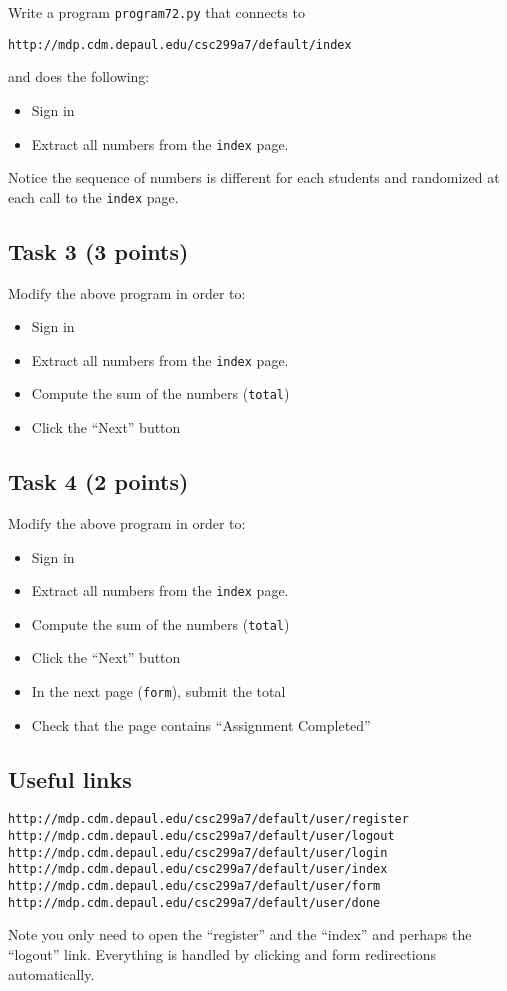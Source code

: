 \documentclass[12pt]{article}
\begin{document}
\noindent Write a program {\tt program72.py} that connects to 

\begin{verbatim}
http://mdp.cdm.depaul.edu/csc299a7/default/index
\end{verbatim}

and does the following:
\begin{itemize}
\item Sign in
\item Extract all numbers from the {\tt index} page.
\end{itemize}

Notice the sequence of numbers is different for each students and randomized at each call to the {\tt index} page.

\subsection{Task 3 (3 points)}

\noindent Modify the above program in order to:
\begin{itemize}
\item Sign in
\item Extract all numbers from the {\tt index} page.
\item Compute the sum of the numbers ({\tt total})
\item Click the ``Next'' button
\end{itemize}

\subsection{Task 4 (2 points)}

\noindent Modify the above program in order to:
\begin{itemize}
\item Sign in
\item Extract all numbers from the {\tt index} page.
\item Compute the sum of the numbers ({\tt total})
\item Click the ``Next'' button
\item In the next page ({\tt form}), submit the total
\item Check that the page contains ``Assignment Completed''
\end{itemize}

\subsection*{Useful links}

\begin{verbatim}
http://mdp.cdm.depaul.edu/csc299a7/default/user/register
http://mdp.cdm.depaul.edu/csc299a7/default/user/logout
http://mdp.cdm.depaul.edu/csc299a7/default/user/login                     
http://mdp.cdm.depaul.edu/csc299a7/default/user/index
http://mdp.cdm.depaul.edu/csc299a7/default/user/form
http://mdp.cdm.depaul.edu/csc299a7/default/user/done
\end{verbatim}

Note you only need to open the ``register'' and the ``index'' and perhaps the ``logout'' link. Everything is handled by clicking and form redirections automatically.
\end{document}
